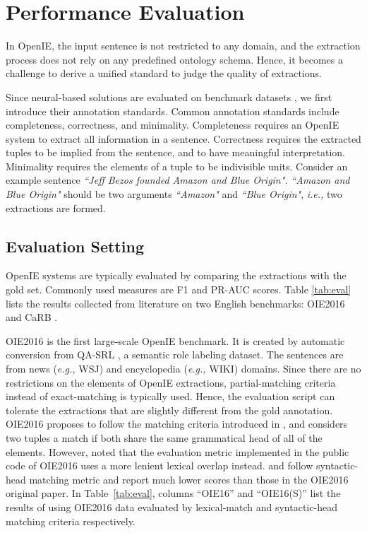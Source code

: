 \documentclass{article}
\newcommand{\ie}{\emph{i.e.,}\xspace}
\newcommand{\eg}{\emph{e.g.,}\xspace}
\begin{document}
\section{Performance Evaluation}
\label{sec:evaluation}
In OpenIE, the input sentence is not restricted to any domain, and the extraction process does not rely on any predefined ontology schema. Hence, it becomes a challenge to derive a unified standard to judge the quality of extractions. 

Since neural-based solutions are evaluated on benchmark datasets \cite{stanovsky-dagan-2016-creating,bhardwaj-etal-2019-carb}, we first introduce their annotation standards.
Common annotation standards include completeness, correctness, and minimality. Completeness requires an OpenIE system to extract all information in a sentence. Correctness requires the extracted tuples to be implied from the sentence, and to have meaningful interpretation. Minimality requires the elements of a tuple to be indivisible units. Consider an example sentence \textit{``Jeff Bezos founded Amazon and Blue Origin".} \textit{``Amazon and Blue Origin"} should be two arguments \textit{``Amazon"} and \textit{``Blue Origin"}, \ie two extractions are formed.

\subsection{Evaluation Setting}
\label{ssec:evalsetting}
OpenIE systems are typically evaluated by comparing the extractions with the gold set. Commonly used measures are F1 and PR-AUC scores. Table \ref{tab:eval} lists the results collected from literature on two English benchmarks: OIE2016 \cite{stanovsky-dagan-2016-creating} and CaRB \cite{bhardwaj-etal-2019-carb}. 

OIE2016 is the first large-scale OpenIE benchmark. It is created by automatic conversion from QA-SRL \cite{he-etal-2015-question}, a semantic role labeling dataset. The sentences are from news (\eg WSJ) and encyclopedia (\eg WIKI) domains. Since there are no restrictions on the elements of OpenIE extractions, partial-matching criteria instead of exact-matching is typically used. Hence, the evaluation script can tolerate the extractions that are slightly different from the gold annotation. OIE2016 proposes to follow the matching criteria introduced in \cite{he-etal-2015-question}, and considers two tuples a match if both share the same grammatical head of all of the elements. However,  \cite{jiang-etal-2019-improving} noted that the evaluation metric implemented in the public code of OIE2016 uses a more lenient lexical overlap instead. \cite{jiang-etal-2019-improving} and \cite{tang-etal-2020-syntactic} follow syntactic-head matching metric and report much lower scores than those in the OIE2016 original paper. In Table~\ref{tab:eval},  columns ``OIE16'' and ``OIE16(S)'' list the results of using OIE2016 data evaluated by lexical-match and syntactic-head matching criteria respectively.
\end{document}
